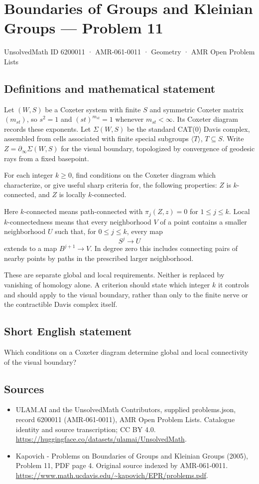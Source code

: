 \documentclass[11pt,a4paper]{article}
\begin{document}
\section*{Boundaries of Groups and Kleinian Groups — Problem 11}\label{6200011}
{\small UnsolvedMath ID 6200011 · AMR-061-0011 · Geometry · AMR Open Problem Lists}
\subsection{Definitions and mathematical statement}
Let $(W,S)$ be a Coxeter system with finite $S$ and symmetric Coxeter matrix $(m_{st})$, so $s^2=1$ and $(st)^{m_{st}}=1$ whenever $m_{st}<\infty$. Its Coxeter diagram records these exponents. Let $\Sigma(W,S)$ be the standard CAT(0) Davis complex, assembled from cells associated with finite special subgroups $\langle T\rangle$, $T\subseteq S$. Write $Z=\partial_\infty\Sigma(W,S)$ for the visual boundary, topologized by convergence of geodesic rays from a fixed basepoint.

For each integer $k\geq0$, find conditions on the Coxeter diagram which characterize, or give useful sharp criteria for, the following properties: $Z$ is $k$-connected, and $Z$ is locally $k$-connected.

Here $k$-connected means path-connected with $\pi_j(Z,z)=0$ for $1\leq j\leq k$. Local $k$-connectedness means that every neighborhood $V$ of a point contains a smaller neighborhood $U$ such that, for $0\leq j\leq k$, every map
\[
 S^j\longrightarrow U
\]
extends to a map $B^{j+1}\to V$. In degree zero this includes connecting pairs of nearby points by paths in the prescribed larger neighborhood.

These are separate global and local requirements. Neither is replaced by vanishing of homology alone. A criterion should state which integer $k$ it controls and should apply to the visual boundary, rather than only to the finite nerve or the contractible Davis complex itself.
\subsection{Short English statement}
Which conditions on a Coxeter diagram determine global and local connectivity of the visual boundary?
\subsection{Sources}
\begin{itemize}
\item[S1] ULAM.AI and the UnsolvedMath Contributors, supplied problems.json, record 6200011 (AMR-061-0011), AMR Open Problem Lists. Catalogue identity and source transcription; CC BY 4.0.
\url{https://huggingface.co/datasets/ulamai/UnsolvedMath}.
\item[S2] Kapovich - Problems on Boundaries of Groups and Kleinian Groups (2005), Problem 11, PDF page 4. Original source indexed by AMR-061-0011.
\url{https://www.math.ucdavis.edu/~kapovich/EPR/problems.pdf}.
\end{itemize}
\end{document}
